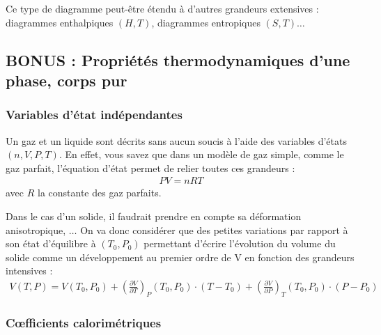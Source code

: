 \documentclass[a4paper]{book}
\begin{document}
Ce type de diagramme peut-être étendu à d'autres grandeurs extensives : diagrammes enthalpiques $(H, T)$, diagrammes entropiques $(S, T)\ldots$ 

\subsection{BONUS : Propriétés thermodynamiques d'une phase, corps pur}
\subsubsection{Variables d'état indépendantes}
Un gaz et un liquide sont décrits sans aucun soucis à l'aide des variables d'états $(n, V, P, T)$. En effet, vous savez que dans un modèle de gaz simple, comme le gaz parfait, l'équation d'état permet de relier toutes ces grandeurs : 
\begin{align*}
PV = nRT
\end{align*}
avec $R$ la constante des gaz parfaits.

Dans le cas d'un solide, il faudrait prendre en compte sa déformation anisotropique, $\ldots$ On va donc considérer que des petites variations par rapport à son état d'équilibre à $(T_0, P_0)$ permettant d'écrire l'évolution du volume du solide comme un développement au premier ordre de V en fonction des grandeurs intensives : 
\begin{align*}
V (T, P) = V(T_0, P_0) + \left( \frac{\partial V}{\partial T} \right)_P(T_0, P_0) \cdot (T-T_0) + \left( \frac{\partial V}{\partial P} \right)_T (T_0, P_0) \cdot (P-P_0)
\end{align*}


\subsubsection{C{\oe}fficients calorimétriques}

\end{document}
